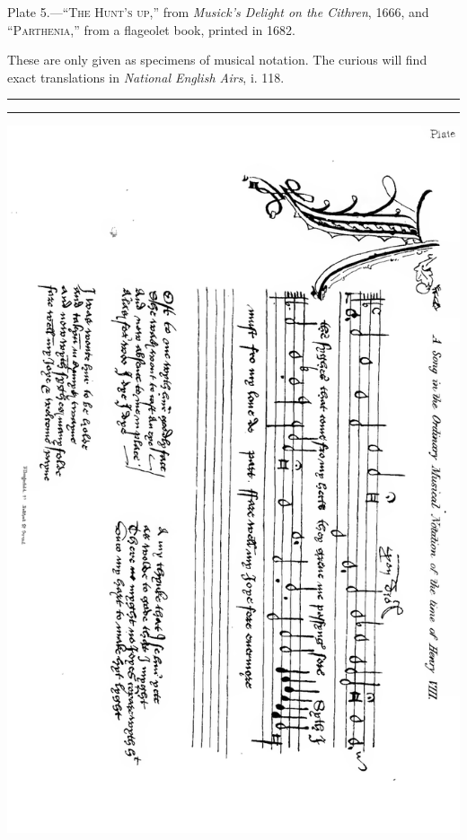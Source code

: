 \bigskip
Plate 5.—“\textsc{The Hunt’s up},” from \textit{Musick's Delight on the Cithren}, 1666, and
“\textsc{Parth\-enia},” from a flageolet book, printed in 1682.

These are only given as specimens of musical notation. The curious will find exact
translations in \textit{National English Airs}, i. 118.
\normalsize

\vfill
{\hspace*{\fill}\rule{4em}{0.4pt}\rule{4em}{0.4pt}\hspace*{\fill}}
\vfill
\pagebreak


\thispagestyle{empty}
\noindent\includegraphics*[width=\textwidth]{music/Plate2X.pdf}


